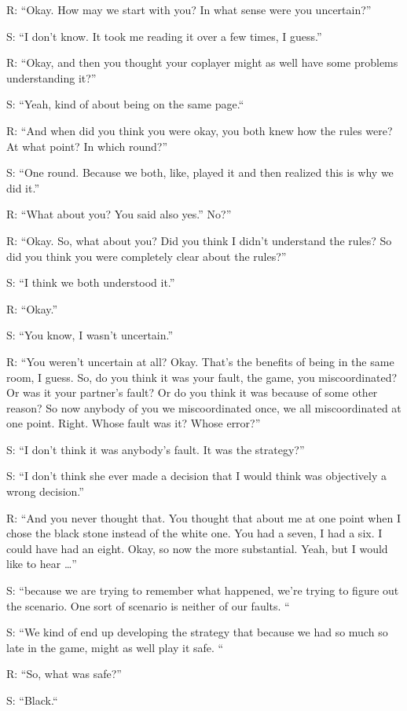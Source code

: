 \documentclass[a4paper,superscriptaddress,nofootinbib]{revtex4}
\begin{document}
R: “Okay. How may we start with you? In what sense were you uncertain?” 

S: “I don't know. It took me reading it over a few times, I guess.” 

R: “Okay, and then you thought your coplayer might as well have some problems understanding it?”

S: “Yeah, kind of about being on the same page.“

R: “And when did you think you were okay, you both knew how the rules were? At what point? In which round?”

S: “One round. Because we both, like, played it and then realized this is why we did it.” 

R: “What about you? You said also yes.” No?”

R: “Okay. So, what about you? Did you think I didn't understand the rules? So did you think you were completely clear about the rules?” 

S: “I think we both understood it.” 

R: “Okay.” 

S: “You know, I wasn't uncertain.”

R: “You weren’t uncertain at all? Okay. That's the benefits of being in the same room, I guess. So, do you think it was your fault, the game, you miscoordinated? Or was it your partner's fault? Or do you think it was because of some other reason? So now anybody of you we miscoordinated once, we all miscoordinated at one point. Right. Whose fault was it? Whose error?”

S: “I don’t think it was anybody’s fault. It was the strategy?” 

S: “I don't think she ever made a decision that I would think was objectively a wrong decision.” 

R: “And you never thought that. You thought that about me at one point when I chose the black stone instead of the white one. You had a seven, I had a six. I could have had an eight. Okay, so now the more substantial. Yeah, but I would like to hear …”

S: “because we are trying to remember what happened, we're trying to figure out the scenario. One sort of scenario is neither of our faults. “

S: “We kind of end up developing the strategy that because we had so much so late in the game, might as well play it safe. “

R: “So, what was safe?”

S: “Black.“
\end{document}
